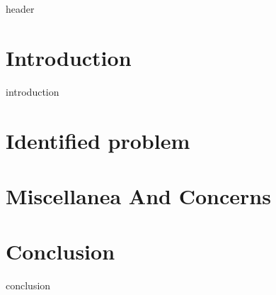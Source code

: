 \documentclass{article}
\begin{document}
{header}

\section{Introduction}
{introduction} 

\section{Identified problem}

\section{Miscellanea And Concerns}


\section{Conclusion}
{conclusion}



\end{document}
